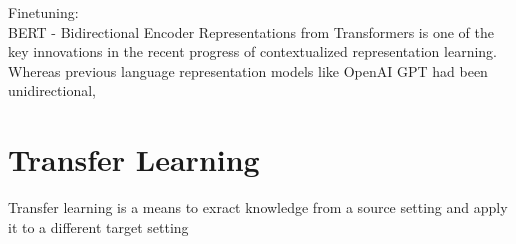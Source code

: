 \documentclass{report}
\begin{document}
Finetuning:\\
BERT - Bidirectional Encoder Representations from Transformers is one of the key innovations in the recent progress of contextualized representation learning. Whereas previous language representation models like OpenAI GPT had been unidirectional, 

\section{Transfer Learning}
Transfer learning is a means to exract knowledge from a source setting and apply it to a different target setting
\end{document}
